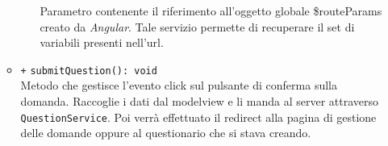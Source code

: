 \begin{itemize}
\begin{itemize}
\begin{itemize}
			Parametro contenente il riferimento all'oggetto globale \$routeParams creato da \textit{Angular}. Tale servizio permette di recuperare il set di variabili presenti nell'url.
		\end{itemize}
		\item \texttt{+} \texttt{submitQuestion(): void}\\ 
		Metodo che gestisce l'evento click sul pulsante di conferma sulla domanda. Raccoglie i dati dal modelview e li manda al server attraverso \texttt{QuestionService}. Poi verrà effettuato il redirect alla pagina di gestione delle domande oppure al questionario che si stava creando.
	\end{itemize}
\end{itemize}

